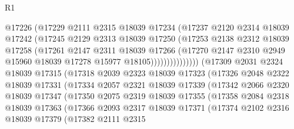 \begin{lexlean}{R1}
\begin{coremodule}
                          @17226
                          (@17229
                            @2111
                            @2315
                            @18039
                            @17234
                            (@17237
                              @2120
                              @2314
                              @18039
                              @17242
                              (@17245
                                @2129
                                @2313
                                @18039
                                @17250
                                (@17253
                                  @2138
                                  @2312
                                  @18039
                                  @17258
                                  (@17261
                                    @2147
                                    @2311
                                    @18039
                                    @17266
                                    (@17270
                                      @2147
                                      @2310
                                      @2949
                                      @15960
                                      @18039
                                      @17278
                                      @15977
                                      @18105)))))))))))))))
        (@17309
          @2031
          @2324
          @18039
          @17315
          (@17318
            @2039
            @2323
            @18039
            @17323
            (@17326
              @2048
              @2322
              @18039
              @17331
              (@17334
                @2057
                @2321
                @18039
                @17339
                (@17342
                  @2066
                  @2320
                  @18039
                  @17347
                  (@17350
                    @2075
                    @2319
                    @18039
                    @17355
                    (@17358
                      @2084
                      @2318
                      @18039
                      @17363
                      (@17366
                        @2093
                        @2317
                        @18039
                        @17371
                        (@17374
                          @2102
                          @2316
                          @18039
                          @17379
                          (@17382
                            @2111
                            @2315

\end{coremodule}
\end{lexlean}
